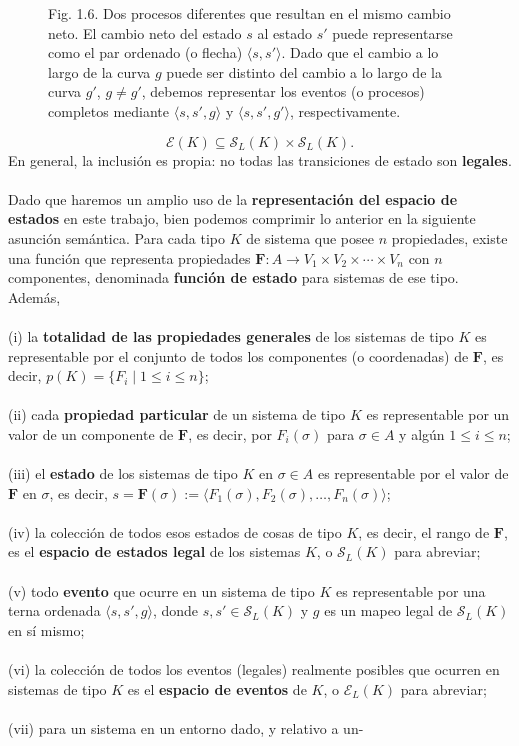 {\fontsize{13}{15}\selectfont
\begin{figure}[h!]
    \centering
    \caption*{Fig. 1.6. Dos procesos diferentes que resultan en el mismo cambio neto. El cambio neto del estado $s$ al estado $s'$ puede representarse como el par ordenado (o flecha) $\langle s, s' \rangle$. Dado que el cambio a lo largo de la curva $g$ puede ser distinto del cambio a lo largo de la curva $g'$, $g \neq g'$, debemos representar los eventos (o procesos) completos mediante $\langle s, s', g \rangle$ y $\langle s, s', g' \rangle$, respectivamente.}
\end{figure}
$$ \mathcal{E}(K) \subseteq \mathcal{S}_L(K) \times \mathcal{S}_L(K). $$En general, la inclusión es propia: no todas las transiciones de estado son \textbf{legales}.
\\
\\
Dado que haremos un amplio uso de la \textbf{representación del espacio de estados} en este trabajo, bien podemos comprimir lo anterior en la siguiente asunción semántica. Para cada tipo $K$ de sistema que posee $n$ propiedades, existe una función que representa propiedades $\mathbf{F}: A \longrightarrow V_1 \times V_2 \times \cdots \times V_n$ con $n$ componentes, denominada \textbf{función de estado} para sistemas de ese tipo. Además,
\\\\
(i) la \textbf{totalidad de las propiedades generales} de los sistemas de tipo $K$ es representable por el conjunto de todos los componentes (o coordenadas) de $\mathbf{F}$, es decir, $p(K) = \{F_i \mid 1 \le i \le n\}$;
\\\\
(ii) cada \textbf{propiedad particular} de un sistema de tipo $K$ es representable por un valor de un componente de $\mathbf{F}$, es decir, por $F_i(\sigma)$ para $\sigma \in A$ y algún $1 \le i \le n$;
\\\\
(iii) el \textbf{estado} de los sistemas de tipo $K$ en $\sigma \in A$ es representable por el valor de $\mathbf{F}$ en $\sigma$, es decir, $s = \mathbf{F}(\sigma) := \langle F_1(\sigma), F_2(\sigma), \ldots, F_n(\sigma) \rangle$;
\\\\
(iv) la colección de todos esos estados de cosas de tipo $K$, es decir, el rango de $\mathbf{F}$, es el \textbf{espacio de estados legal} de los sistemas $K$, o $\mathcal{S}_L(K)$ para abreviar;
\\\\
(v) todo \textbf{evento} que ocurre en un sistema de tipo $K$ es representable por una terna ordenada $\langle s, s', g \rangle$, donde $s, s' \in \mathcal{S}_L(K)$ y $g$ es un mapeo legal de $\mathcal{S}_L(K)$ en sí mismo;
\\\\
(vi) la colección de todos los eventos (legales) realmente posibles que ocurren en sistemas de tipo $K$ es el \textbf{espacio de eventos} de $K$, o $\mathcal{E}_L(K)$ para abreviar;
\\\\
(vii) para un sistema en un entorno dado, y relativo a un-
}
